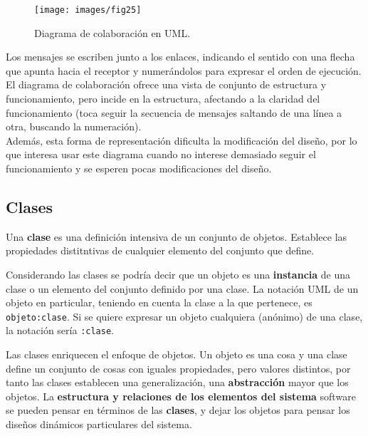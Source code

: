 \begin{figure}[ht!]  \centering
  \texttt{[image: images/fig25]}
  \caption{Diagrama de colaboración en UML.}
  \label{fig:25}
\end{figure}

Los mensajes se escriben junto a los enlaces, indicando el sentido con
una flecha que apunta hacia el receptor y numerándolos para expresar
el orden de ejecución. \\
El diagrama de colaboración ofrece una vista de conjunto de estructura
y funcionamiento, pero incide en la estructura, afectando a la
claridad del funcionamiento (toca seguir la secuencia de mensajes
saltando de una línea a otra, buscando la numeración).\\
Además, esta forma de representación dificulta la modificación del
diseño, por lo que interesa usar este diagrama cuando no interese
demasiado seguir el funcionamiento y se esperen pocas modificaciones
del diseño.

\subsection{Clases}
Una \textbf{clase} es una definición intensiva de un conjunto de
objetos. Establece las propiedades distitntivas de cualquier elemento
del conjunto que define.\\

\vspace{5mm}

Considerando las clases se podría decir que un objeto es una
\textbf{instancia} de una clase o un elemento del conjunto definido
por una clase. La notación UML de un objeto en particular, teniendo en
cuenta la clase a la que pertenece, es \texttt{objeto:clase}. Si se
quiere expresar un objeto cualquiera (anónimo) de una clase, la
notación sería \texttt{:clase}.

\vspace{5mm}

Las clases enriquecen el enfoque de objetos. Un objeto es una cosa y
una clase define un conjunto de cosas con iguales propiedades, pero
valores distintos, por tanto las clases establecen una generalización,
una \textbf{abstracción} mayor que los objetos. La \textbf{estructura y
  relaciones de los elementos del sistema} software se pueden pensar en
términos de las \textbf{clases}, y dejar los objetos para pensar los diseños
dinámicos particulares del sistema.

\vspace{5mm}

